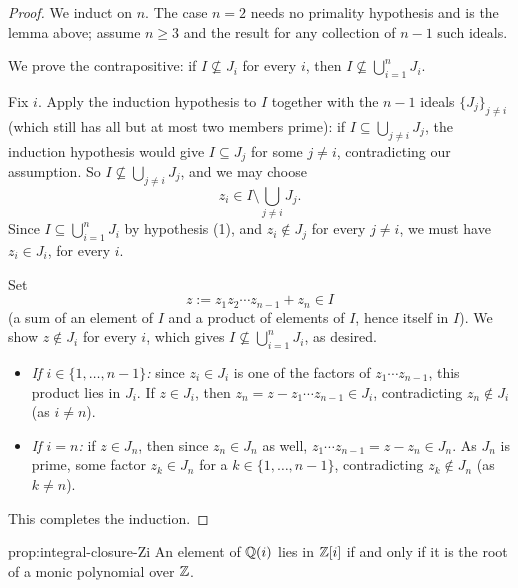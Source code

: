 \begin{proof}
We induct on $n$. The case $n=2$ needs no primality hypothesis and is the lemma above; assume $n \geq 3$ and the result for any collection of $n-1$ such ideals.

We prove the contrapositive: if $I \not\subseteq J_i$ for every $i$, then $I \not\subseteq \bigcup_{i=1}^n J_i$.

Fix $i$. Apply the induction hypothesis to $I$ together with the $n-1$ ideals $\{J_j\}_{j \neq i}$ (which still has all but at most two members prime): if $I \subseteq \bigcup_{j \neq i} J_j$, the induction hypothesis would give $I \subseteq J_j$ for some $j \neq i$, contradicting our assumption. So $I \not\subseteq \bigcup_{j \neq i} J_j$, and we may choose
\[
z_i \in I \setminus \bigcup_{j \neq i} J_j.
\]
Since $I \subseteq \bigcup_{i=1}^n J_i$ by hypothesis (1), and $z_i \notin J_j$ for every $j \neq i$, we must have $z_i \in J_i$, for every $i$.

Set
\[
z := z_1 z_2 \cdots z_{n-1} + z_n \in I
\]
(a sum of an element of $I$ and a product of elements of $I$, hence itself in $I$). We show $z \notin J_i$ for every $i$, which gives $I \not\subseteq \bigcup_{i=1}^n J_i$, as desired.

\begin{itemize}
    \item \emph{If $i \in \{1, \ldots, n-1\}$:} since $z_i \in J_i$ is one of the factors of $z_1 \cdots z_{n-1}$, this product lies in $J_i$. If $z \in J_i$, then $z_n = z - z_1 \cdots z_{n-1} \in J_i$, contradicting $z_n \notin J_i$ (as $i \neq n$).
    \item \emph{If $i = n$:} if $z \in J_n$, then since $z_n \in J_n$ as well, $z_1 \cdots z_{n-1} = z - z_n \in J_n$. As $J_n$ is prime, some factor $z_k \in J_n$ for a $k \in \{1, \ldots, n-1\}$, contradicting $z_k \notin J_n$ (as $k \neq n$).
\end{itemize}
This completes the induction.
\end{proof}

\begin{proposition}{}{prop:integral-closure-Zi}
An element of $\mathbb{Q}(i)$ lies in $\mathbb{Z}[i]$ if and only if it is the root of a monic polynomial over $\mathbb{Z}$.
\end{proposition}

